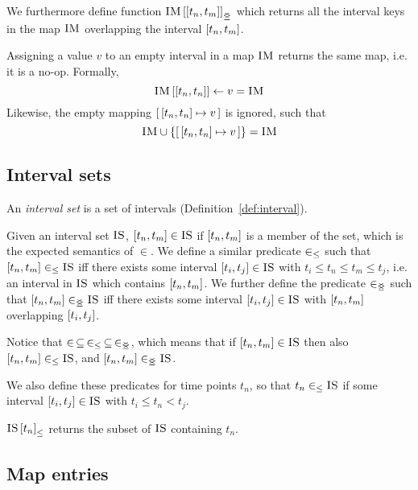 We furthermore define function $\overlapping{\map{IM}}{t_n}{t_m}$ which returns all the interval keys in the map $\textsc{IM}$ overlapping the interval $\interval{t_n}{t_m}$. 

Assigning a value $v$ to an empty interval in a map $\textsc{IM}$ returns the same map, i.e. it is a no-op. Formally,
\[
  \lookup{\map{IM}}{\interval{t_n}{t_n}} \assign v = \map{IM}
\]
Likewise, the empty mapping $\intervalmapping{t_n}{t_n}{v}$ is ignored, such that
\[
  \map{IM} \cup \set{\intervalmapping{t_n}{t_n}{v}} = \map{IM}
\]

\subsection{Interval sets}
\label{sub:interval-sets}

\begin{definition}
  An \emph{interval set} is a set of intervals (Definition~\vref{def:interval}). 
\end{definition}

Given an interval set $\textsc{IS}$, $\interval{t_n}{t_m} \in \map{IS}$ if $\interval{t_n}{t_m}$ is a member of the set, which is the expected semantics of $\in$. We define a similar predicate $\in_\leq$ such that $\interval{t_n}{t_m} \inn \map{IS}$ iff there exists some interval $\interval{t_i}{t_j} \in \map{IS}$ with $t_i \leq t_n \leq t_m \leq t_j$, i.e. an interval in $\textsc{IS}$ which contains $\interval{t_n}{t_m}$. We further define the predicate $\in_{\leq\!\!\!\!\geq{}}$ such that $\interval{t_n}{t_m} \innr \map{IS}$ iff there exists some interval $\interval{t_i}{t_j} \in \map{IS}$ with $\interval{t_n}{t_m}$ overlapping $\interval{t_i}{t_j}$. 

Notice that $\in \, \subseteq \, \in_\leq \, \subseteq \, \in_{\leq\!\!\!\!\geq{}}$, which means that if $\interval{t_n}{t_m} \in \map{IS}$ then also $\interval{t_n}{t_m} \inn \map{IS}$, and $\interval{t_n}{t_m} \innr \map{IS}$. 

We also define these predicates for time points $t_n$, so that $t_n \in_\leq \textsc{IS}$ if some interval $\interval{t_i}{t_j} \in \map{IS}$ with $t_i \leq t_n < t_j$. 

${\textsc{IS} \left[ t_n \right]}_{\leq}$ returns the subset of $\textsc{IS}$ containing $t_n$.

\subsection{Map entries}
\label{sub:map-entries}
